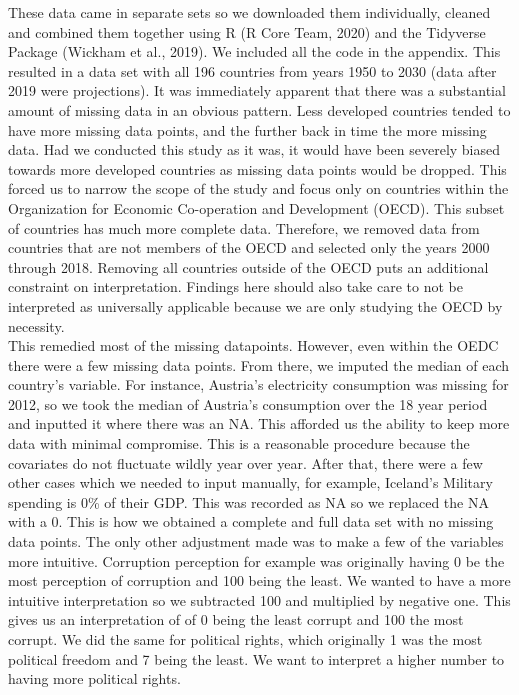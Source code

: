 \documentclass[
  english,
  man,floatsintext]{apa6}
\begin{document}
These data came in separate sets so we downloaded them individually, cleaned and combined them together using R (R Core Team, 2020) and the Tidyverse Package (Wickham et al., 2019). We included all the code in the appendix. This resulted in a data set with all 196 countries from years 1950 to 2030 (data after 2019 were projections). It was immediately apparent that there was a substantial amount of missing data in an obvious pattern. Less developed countries tended to have more missing data points, and the further back in time the more missing data. Had we conducted this study as it was, it would have been severely biased towards more developed countries as missing data points would be dropped. This forced us to narrow the scope of the study and focus only on countries within the Organization for Economic Co-operation and Development (OECD). This subset of countries has much more complete data. Therefore, we removed data from countries that are not members of the OECD and selected only the years 2000 through 2018. Removing all countries outside of the OECD puts an additional constraint on interpretation. Findings here should also take care to not be interpreted as universally applicable because we are only studying the OECD by necessity.\\
This remedied most of the missing datapoints. However, even within the OEDC there were a few missing data points. From there, we imputed the median of each country's variable. For instance, Austria's electricity consumption was missing for 2012, so we took the median of Austria's consumption over the 18 year period and inputted it where there was an NA. This afforded us the ability to keep more data with minimal compromise. This is a reasonable procedure because the covariates do not fluctuate wildly year over year. After that, there were a few other cases which we needed to input manually, for example, Iceland's Military spending is 0\% of their GDP. This was recorded as NA so we replaced the NA with a 0. This is how we obtained a complete and full data set with no missing data points. The only other adjustment made was to make a few of the variables more intuitive. Corruption perception for example was originally having 0 be the most perception of corruption and 100 being the least. We wanted to have a more intuitive interpretation so we subtracted 100 and multiplied by negative one. This gives us an interpretation of of 0 being the least corrupt and 100 the most corrupt. We did the same for political rights, which originally 1 was the most political freedom and 7 being the least. We want to interpret a higher number to having more political rights.
\end{document}
